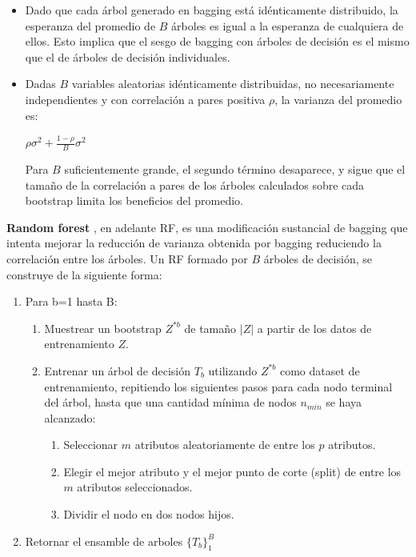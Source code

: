 \begin{itemize}
\item Dado que cada árbol generado en bagging está idénticamente distribuido, la esperanza del promedio de $B$ árboles es igual a la esperanza de cualquiera de ellos. Esto implica que el sesgo de bagging con árboles de decisión es el mismo que el de árboles de decisión individuales.
\item Dadas $B$ variables aleatorias idénticamente distribuidas, no necesariamente independientes y con correlación a pares positiva $\rho$, la varianza del promedio es:

\begin{center}
$\rho \sigma^2 + \frac{1-\rho}{B} \sigma^2$
\end{center}

Para $B$ suficientemente grande, el segundo término desaparece, y sigue que el tamaño de la correlación a pares de los árboles calculados sobre cada bootstrap limita los beneficios del promedio.
\end{itemize}

\textbf{Random forest} \cite{rf}, en adelante RF, es una modificación sustancial de bagging que intenta mejorar la reducción de varianza obtenida por bagging reduciendo la correlación entre los árboles. Un RF formado por $B$ árboles de decisión, se construye de la siguiente forma:

\begin{enumerate}
\item Para b=1 hasta B:
\begin{enumerate}
\item Muestrear un bootstrap $Z^{*b}$ de tamaño $|Z|$ a partir de los datos de entrenamiento $Z$.
\item Entrenar un árbol de decisión $T_b$ utilizando $Z^{*b}$ como dataset de entrenamiento, repitiendo los siguientes pasos para cada nodo terminal del árbol, hasta que una cantidad mínima de nodos $n_{min}$ se haya alcanzado:
\begin{enumerate}
\item Seleccionar $m$ atributos aleatoriamente de entre los $p$ atributos.
\item Elegir el mejor atributo y el mejor punto de corte (split) de entre los $m$ atributos seleccionados.
\item Dividir el nodo en dos nodos hijos.
\end{enumerate}
\end{enumerate}
\item Retornar el ensamble de arboles $\{ T_b \}^B_1$
\end{enumerate}


